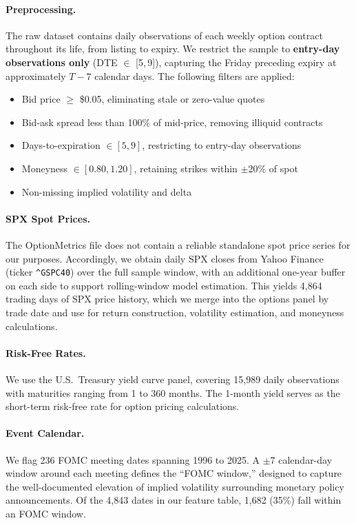 \documentclass[11pt,a4paper]{article}
\begin{document}
\paragraph{Preprocessing.}
The raw dataset contains daily observations of each weekly option contract throughout its life, from listing to expiry.
We restrict the sample to \textbf{entry-day observations only} (DTE $\in$ [5,\,9]), capturing the Friday preceding expiry at approximately $T{-}7$ calendar days.
The following filters are applied:
\begin{itemize}[nosep]
    \item Bid price $\geq$ \$0.05, eliminating stale or zero-value quotes
    \item Bid-ask spread less than 100\% of mid-price, removing illiquid contracts
    \item Days-to-expiration $\in [5, 9]$, restricting to entry-day observations
    \item Moneyness $\in [0.80, 1.20]$, retaining strikes within $\pm$20\% of spot
    \item Non-missing implied volatility and delta
\end{itemize}


\paragraph{SPX Spot Prices.}
The OptionMetrics file does not contain a reliable standalone spot price series for our purposes.
Accordingly, we obtain daily SPX closes from Yahoo Finance (ticker \texttt{\^{}GSPC40}) over the full sample window, with an additional one-year buffer on each side to support rolling-window model estimation.
This yields 4{,}864 trading days of SPX price history, which we merge into the options panel by trade date and use for return construction, volatility estimation, and moneyness calculations.

\paragraph{Risk-Free Rates.}
We use the U.S.\ Treasury yield curve panel, covering 15{,}989 daily observations with maturities ranging from 1 to 360 months.
The 1-month yield serves as the short-term risk-free rate for option pricing calculations.

\paragraph{Event Calendar.}
We flag 236 FOMC meeting dates spanning 1996 to 2025.
A $\pm$7 calendar-day window around each meeting defines the ``FOMC window,'' designed to capture the well-documented elevation of implied volatility surrounding monetary policy announcements.
Of the 4{,}843 dates in our feature table, 1{,}682 (35\%) fall within an FOMC window.
\end{document}
